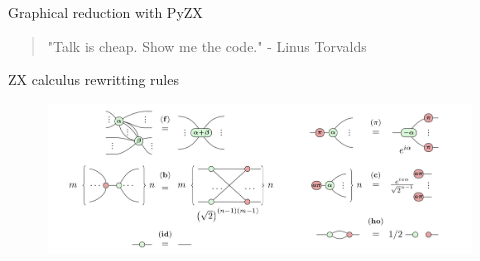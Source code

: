 \documentclass[aspectratio=169,xcolor=dvipsnames, t]{beamer}
\begin{document}
\begin{frame}{Graphical reduction with PyZX}
    \vspace{2.5cm}
    \begin{quotation}
        "Talk is cheap. Show me the code." - Linus Torvalds
    \end{quotation}

\end{frame}





\appendix
\begin{frame}{ZX calculus rewritting rules}
\begin{figure}
    \includegraphics[width=\textwidth]{figures/zx_rewrite_rules_p1.png}
\end{figure}    
\end{frame}
\end{document}
